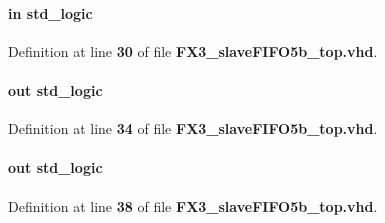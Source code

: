 \paragraph[{reset\+\_\+n}]{ {\bfseries \textcolor{keywordflow}{in}\textcolor{vhdlchar}{ }} {\bfseries \textcolor{comment}{std\+\_\+logic}\textcolor{vhdlchar}{ }} \hspace{0.3cm}{\ttfamily [Port]}}\label{classFX3__slaveFIFO5b__top_a446ea52ed8c4a84181a47d9165ce41a5}


Definition at line {\bf 30} of file {\bf F\+X3\+\_\+slave\+F\+I\+F\+O5b\+\_\+top.\+vhd}.

\paragraph[{slcs}]{ {\bfseries \textcolor{keywordflow}{out}\textcolor{vhdlchar}{ }} {\bfseries \textcolor{comment}{std\+\_\+logic}\textcolor{vhdlchar}{ }} \hspace{0.3cm}{\ttfamily [Port]}}\label{classFX3__slaveFIFO5b__top_a38048c4ac1ac15eb81e102b8a18e4eed}


Definition at line {\bf 34} of file {\bf F\+X3\+\_\+slave\+F\+I\+F\+O5b\+\_\+top.\+vhd}.

\paragraph[{sloe}]{ {\bfseries \textcolor{keywordflow}{out}\textcolor{vhdlchar}{ }} {\bfseries \textcolor{comment}{std\+\_\+logic}\textcolor{vhdlchar}{ }} \hspace{0.3cm}{\ttfamily [Port]}}\label{classFX3__slaveFIFO5b__top_a6129c3e925f301d8c6af3e40daef44dd}


Definition at line {\bf 38} of file {\bf F\+X3\+\_\+slave\+F\+I\+F\+O5b\+\_\+top.\+vhd}.

